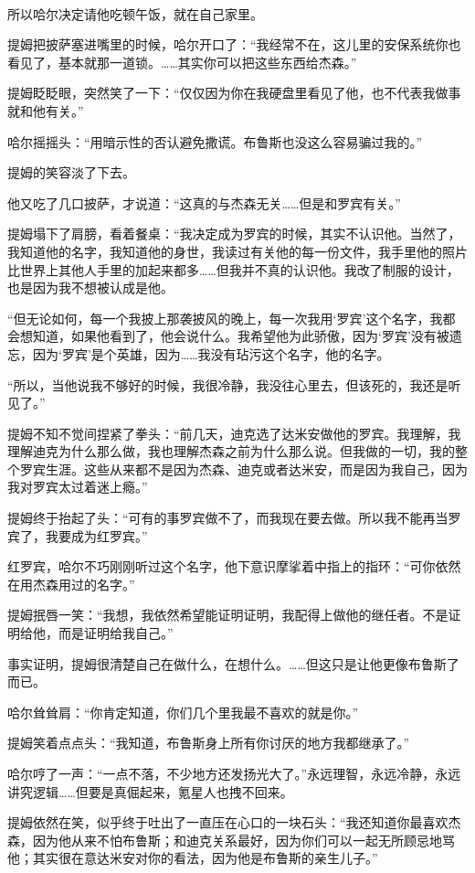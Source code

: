 \documentclass[../main]{subfiles}
\begin{document}
~\

所以哈尔决定请他吃顿午饭，就在自己家里。

提姆把披萨塞进嘴里的时候，哈尔开口了：“我经常不在，这儿里的安保系统你也看见了，基本就那一道锁。……其实你可以把这些东西给杰森。”

提姆眨眨眼，突然笑了一下：“仅仅因为你在我硬盘里看见了他，也不代表我做事就和他有关。”

哈尔摇摇头：“用暗示性的否认避免撒谎。布鲁斯也没这么容易骗过我的。”

提姆的笑容淡了下去。

他又吃了几口披萨，才说道：“这真的与杰森无关……但是和罗宾有关。”

提姆塌下了肩膀，看着餐桌：“我决定成为罗宾的时候，其实不认识他。当然了，我知道他的名字，我知道他的身世，我读过有关他的每一份文件，我手里他的照片比世界上其他人手里的加起来都多……但我并不真的认识他。我改了制服的设计，也是因为我不想被认成是他。

“但无论如何，每一个我披上那袭披风的晚上，每一次我用‘罗宾’这个名字，我都会想知道，如果他看到了，他会说什么。我希望他为此骄傲，因为‘罗宾’没有被遗忘，因为‘罗宾’是个英雄，因为……我没有玷污这个名字，他的名字。

“所以，当他说我不够好的时候，我很冷静，我没往心里去，但该死的，我还是听见了。”

提姆不知不觉间捏紧了拳头：“前几天，迪克选了达米安做他的罗宾。我理解，我理解迪克为什么那么做，我也理解杰森之前为什么那么说。但我做的一切，我的整个罗宾生涯。这些从来都不是因为杰森、迪克或者达米安，而是因为我自己，因为我对罗宾太过着迷上瘾。”

提姆终于抬起了头：“可有的事罗宾做不了，而我现在要去做。所以我不能再当罗宾了，我要成为红罗宾。”

红罗宾，哈尔不巧刚刚听过这个名字，他下意识摩挲着中指上的指环：“可你依然在用杰森用过的名字。”

提姆抿唇一笑：“我想，我依然希望能证明证明，我配得上做他的继任者。不是证明给他，而是证明给我自己。”

事实证明，提姆很清楚自己在做什么，在想什么。……但这只是让他更像布鲁斯了而已。

哈尔耸耸肩：“你肯定知道，你们几个里我最不喜欢的就是你。”

提姆笑着点点头：“我知道，布鲁斯身上所有你讨厌的地方我都继承了。”

哈尔哼了一声：“一点不落，不少地方还发扬光大了。”永远理智，永远冷静，永远讲究逻辑……但要是真倔起来，氪星人也拽不回来。

提姆依然在笑，似乎终于吐出了一直压在心口的一块石头：“我还知道你最喜欢杰森，因为他从来不怕布鲁斯；和迪克关系最好，因为你们可以一起无所顾忌地骂他；其实很在意达米安对你的看法，因为他是布鲁斯的亲生儿子。”
\end{document}
